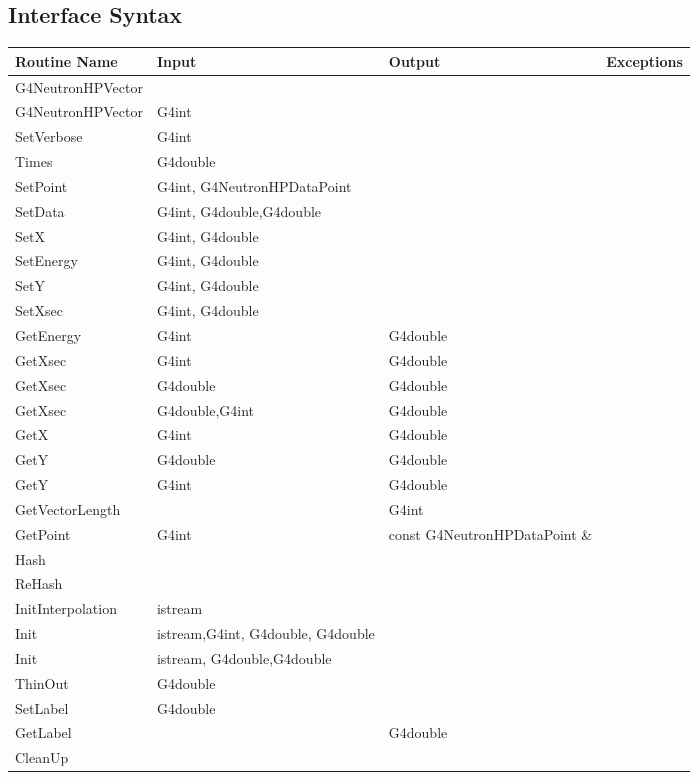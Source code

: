 \documentclass[12pt]{article}
\begin{document}
\subsection{Interface Syntax}%
\begin{tabular}{| p{4cm} | p{4cm} | p{4cm} |  p{4cm} |}
\hline
Routine Name & Input & Output & Exceptions \\ \hline
G4NeutronHPVector & & & \\ \hline
G4NeutronHPVector & G4int & & \\ \hline
SetVerbose & G4int & & \\ \hline
Times &G4double & & \\ \hline
SetPoint  &G4int, G4NeutronHPDataPoint & & \\ \hline
SetData & G4int, G4double,G4double& & \\ \hline
SetX & G4int, G4double & & \\ \hline
SetEnergy & G4int, G4double & & \\ \hline
SetY & G4int, G4double & & \\ \hline
SetXsec & G4int, G4double & & \\ \hline
GetEnergy & G4int & G4double & \\ \hline
GetXsec & G4int & G4double & \\ \hline
GetXsec & G4double & G4double & \\ \hline
GetXsec & G4double,G4int & G4double & \\ \hline
GetX & G4int & G4double & \\ \hline
GetY & G4double & G4double & \\ \hline
GetY & G4int & G4double & \\ \hline
GetVectorLength & & G4int & \\ \hline
GetPoint & G4int & const G4NeutronHPDataPoint \& & \\ \hline
Hash & & & \\ \hline
ReHash & & & \\ \hline
InitInterpolation & istream & & \\ \hline
Init & istream,G4int, G4double, G4double& & \\ \hline
Init & istream, G4double,G4double & & \\ \hline
ThinOut & G4double & & \\ \hline
SetLabel & G4double & & \\ \hline
GetLabel & & G4double & \\ \hline
CleanUp & & & \\ \hline
\end{tabular}
\end{document}
